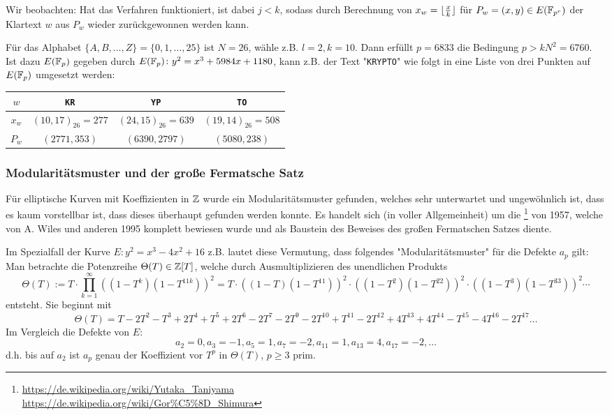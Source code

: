 \begin{bem}
	Wir beobachten: Hat das Verfahren funktioniert, ist dabei $j < k$, sodass durch Berechnung von $x_w = \lfloor\frac{x}{k}\rfloor$ für $P_w=(x,y) \in E(\mathbb{F}_{p^r})$ der Klartext $w$ aus $P_w$ wieder zurückgewonnen werden kann.
\end{bem}

\begin{bsp}
	Für das Alphabet $\{A,B,\dots,Z\} = \{0,1,\dots,25\}$ ist $N = 26$, wähle z.B. $l = 2, k=10$.
	Dann erfüllt $p=6833$ die Bedingung $p > kN^2 = 6760$.
	Ist dazu $E(\mathbb{F}_p)$ gegeben durch $E(\mathbb{F}_p)\colon y^2 = x^3 + 5984x + 1180$, kann z.B. der Text "\texttt{KRYPTO}" wie folgt in eine Liste von drei Punkten auf $E(\mathbb{F}_p)$ umgesetzt werden:
	\begin{center}
		\begin{tabular}{c||c|c|c}
		$w$ & \texttt{KR} & \texttt{YP} & \texttt{TO} \\ 
		\hline $x_w$ & $(10,17)_{26} = 277$ & $(24,15)_{26} = 639$ & $(19,14)_{26} = 508$ \\ 
		\hline $P_w$ & $(2771,353)$ & $(6390,2797)$ & $(5080,238)$
		\end{tabular} 
	\end{center}
\end{bsp}

\nextlecture
\subsubsection{Modularitätsmuster und der große Fermatsche Satz}
\label{subsub:3.3.2}
\begin{bem}
	Für elliptische Kurven mit Koeffizienten in $\mathbb{Z}$ wurde ein Modularitätsmuster gefunden,\marginnote{[18]} welches sehr unterwartet und ungewöhnlich ist, dass es kaum vorstellbar ist, dass dieses überhaupt gefunden werden konnte.
	Es handelt sich (in voller Allgemeinheit) um die \footnote{\url{https://de.wikipedia.org/wiki/Yutaka_Taniyama} \\ \url{https://de.wikipedia.org/wiki/Gor\%C5\%8D_Shimura}} von 1957, welche von A. Wiles und anderen 1995 komplett bewiesen wurde und als Baustein des Beweises des großen Fermatschen Satzes diente.
\end{bem}

\begin{bsp}
	Im Spezialfall der Kurve $E\colon y^2 = x^3 - 4x^2 + 16$ z.B. lautet diese Vermutung, dass folgendes "Modularitätsmuster" für die Defekte $a_p$ gilt: \\
	Man betrachte die Potenzreihe $\Theta(T) \in \mathbb{Z}[T]$, welche durch Ausmultiplizieren des unendlichen Produkts
	\[
		\Theta(T) := T \cdot \prod_{k=1}^{\infty} ((1-T^k)(1-T^{11k}))^2 = T \cdot ((1-T)(1-T^{11}))^2 \cdot ((1-T^2)(1-T^{22}))^2 \cdot ((1-T^3)(1-T^{33}))^2 \cdots
	\]
	entsteht.
	Sie beginnt mit
	\[
		\Theta(T) = T - 2T^2 - T^3 + 2T^4 + T^5 + 2T^6 - 2T^7 - 2T^9 - 2T^{10} + T^{11} - 2T^{12} + 4T^{13} + 4T^{14} - T^{15} - 4T^{16} - 2T^{17} \dots
	\]
	Im Vergleich die Defekte von $E$:
	\[
		a_2 = 0, a_3 = -1, a_5 = 1, a_7 = -2, a_{11} = 1, a_{13} = 4, a_{17} = -2, \dots
	\]
	d.h. bis auf $a_2$ ist $a_p$ genau der Koeffizient vor $T^p$ in $\Theta(T)$, $p \geq 3$ prim.
\end{bsp}

